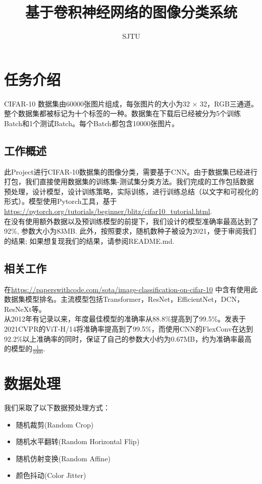 \documentclass[hyperref, UTF8, 12pt]{article}
\theoremstyle{definition}
\begin{document}
\title{基于卷积神经网络的图像分类系统}
\author{SJTU}
\maketitle

\section{任务介绍}
CIFAR-10 数据集由60000张图片组成，每张图片的大小为32 $\times$ 32，RGB三通道。整个数据集都被标记为十个标签的一种。数据集在下载后已经被分为5个训练Batch和1个测试Batch。每个Batch都包含10000张图片。\cite{krizhevsky2009learning}

\subsection{工作概述}
此Project进行CIFAR-10数据集的图像分类，需要基于CNN。由于数据集已经进行打包，我们直接使用数据集的训练集-测试集分类方法。我们完成的工作包括数据预处理，设计模型，设计训练策略，实际训练，进行训练总结（以文字和可视化的形式）。模型使用Pytorch工具，基于\url{https://pytorch.org/tutorials/beginner/blitz/cifar10_tutorial.html}. \\
\indent
在没有使用额外数据以及预训练模型的前提下，我们设计的模型准确率最高达到了92\%, 参数大小为83MB. 此外，按照要求，随机数种子被设为2021，便于审阅我们的结果; 如果想复现我们的结果，请参阅README.md.

\subsection {相关工作}
在\url{https://paperswithcode.com/sota/image-classification-on-cifar-10} 中含有使用此数据集模型排名。主流模型包括Transformer\cite{dosovitskiy2021image}，ResNet\cite{kolesnikov2020big}，EfficientNet\cite{tan2021efficientnetv2}，DCN\cite{sousa2021cnn}，ResNeXt\cite{Li_2019_CVPR}等。\\
\indent 从2012年有记录以来，年度最佳模型的准确率从88.8\%提高到了99.5\%。发表于2021CVPR的ViT-H/14将准确率提高到了99.5\%\cite{dosovitskiy2021image}，而使用CNN的FlexConv在达到92.2\%以上准确率的同时\cite{romero2021flexconv}，保证了自己的参数大小约为0.67MB，约为准确率最高的模型的$\frac{1}{1000}$.


\section{数据处理}
我们采取了以下数据预处理方式：
\begin{itemize}
\item 随机裁剪(Random Crop)
\item 随机水平翻转(Random Horizontal Flip)
\item 随机仿射变换(Random Affine)
\item 颜色抖动(Color Jitter)
\end{itemize}
\end{document}
